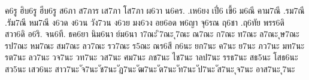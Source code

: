 {ค6รู
ฮิบ6รู
ฮีบ6รู
ส6ภา
ส7ภาร
เส7ภา
โส7ภา
ผ6วา
น6คร.
.เห6ยง
เปี่6
เขี้6
ม6ณี
คาม7ณี
.รม7ณี
.รัม7ณี
หม7ณี
ง6วด
ง6วน
วัง7วน
ง6วย
มง6วง
อย6อด
พ6ญา
จุ6รณ
ฤ6ชา
.ฤ6ทัย
พรร6ดิ
สวา6ดิ
อ6ริ.
จน6ที.
ธค6ยา
นิม6นา
ย์ม6นา
า7ณะ
ิ7ณะ
ุ7ณะ
ณ7ณะ
ก7ณะ
ท7ณะ
ล7ณะ
ุษ7ณะ
รป7ณะ
หม7ณะ
สม7ณะ
ลว7ณะ
รว7ณะ
ร5ณะ
ณร6สี
ก6นะ
ยก7นะ
ค7นะ
ย7นะ
ภว7นะ
มท7นะ
รต7นะ
ลว7นะ
วจ7นะ
วท7นะ
วส7นะ
ศม7นะ
ภช7นะ
ไช7นะ
าลป7นะ
รรธ7นะ
สธ5นะ
โสธ6นะ
สว5นะ
เสว6นะ
สาว7นะ
ัจ7นะ
ัช7นะ
ัฏ7นะ
ัฒ7นะ
ัต7นะ
ัท7นะ
ัป7นะ
ัส7นะ
ุจ7นะ
อาส7นะ
ุ7นะ
}
